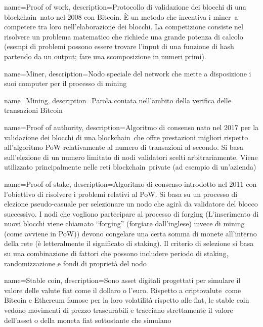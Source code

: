{
	name={Proof of work},
	description={Protocollo di validazione dei blocchi di una blockchain\glo\ nato nel 2008 con Bitcoin. È un metodo che incentiva i miner\glo\ a competere tra loro nell’elaborazione dei blocchi. La competizione consiste nel risolvere un problema matematico che richiede una grande potenza di calcolo (esempi di problemi possono essere trovare l’input di una funzione di hash partendo da un output; fare una scomposizione in numeri primi).
	}
}

{
	name={Miner},
	description={Nodo speciale del network che mette a disposizione i suoi computer per il processo di mining\glo}
}

{
	name={Mining},
	description={Parola coniata nell’ambito della verifica delle transazioni Bitcoin}
}

{
	name={Proof of authority},
	description={Algoritmo di consenso nato nel 2017 per la validazione dei blocchi di una blockchain\glo\ che offre prestazioni migliori rispetto all’algoritmo PoW relativamente al numero di transazioni al secondo. Si basa sull’elezione di un numero limitato di nodi validatori scelti arbitrariamente. Viene utilizzato principalmente nelle reti blockchain\glo\ private (ad esempio di un’azienda)}
}

{
	name={Proof of stake},
	description={Algoritmo di consenso introdotto nel 2011 con l’obiettivo di risolvere i problemi relativi al PoW. Si basa su un processo di elezione pseudo-casuale per selezionare un nodo che agirà da validatore del blocco successivo.  I nodi che vogliono partecipare al processo di forging (L’inserimento di nuovi blocchi viene chiamato “forging” (forgiare dall’inglese) invece di mining (come avviene in PoW)) devono congelare una certa somma di monete all’interno della rete (è letteralmente il significato di staking). Il criterio di selezione si basa su una combinazione di fattori che possono includere periodo di staking, randomizzazione e fondi di proprietà del nodo}
}

{
	name={Stable coin},
	description={Sono asset digitali progettati per simulare il valore delle valute fiat come il dollaro o l'euro. Rispetto a criptovalute\glo\ come Bitcoin e Ethereum famose per la loro volatilità rispetto alle fiat, le stable coin vedono movimenti di prezzo trascurabili e tracciano strettamente il valore dell'asset o della moneta fiat sottostante che simulano}
}

